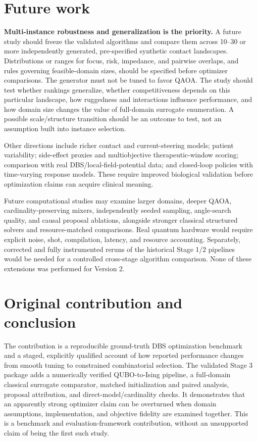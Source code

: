 \documentclass[11pt,letterpaper]{article}
\begin{document}
\section{Future work}
\textbf{Multi-instance robustness and generalization is the priority.} A future study should freeze the validated algorithms and compare them across 10--30 or more independently generated, pre-specified synthetic contact landscapes. Distributions or ranges for focus, risk, impedance, and pairwise overlaps, and rules governing feasible-domain sizes, should be specified before optimizer comparisons. The generator must not be tuned to favor QAOA. The study should test whether rankings generalize, whether competitiveness depends on this particular landscape, how ruggedness and interactions influence performance, and how domain size changes the value of full-domain surrogate enumeration. A possible scale/structure transition should be an outcome to test, not an assumption built into instance selection.

Other directions include richer contact and current-steering models; patient variability; side-effect proxies and multiobjective therapeutic-window scoring; comparison with real DBS/local-field-potential data; and closed-loop policies with time-varying response models. These require improved biological validation before optimization claims can acquire clinical meaning.

Future computational studies may examine larger domains, deeper QAOA, cardinality-preserving mixers, independently seeded sampling, angle-search quality, and causal proposal ablations, alongside stronger classical structured solvers and resource-matched comparisons. Real quantum hardware would require explicit noise, shot, compilation, latency, and resource accounting. Separately, corrected and fully instrumented reruns of the historical Stage 1/2 pipelines would be needed for a controlled cross-stage algorithm comparison. None of these extensions was performed for Version 2.

\section{Original contribution and conclusion}
The contribution is a reproducible ground-truth DBS optimization benchmark and a staged, explicitly qualified account of how reported performance changes from smooth tuning to constrained combinatorial selection. The validated Stage 3 package adds a numerically verified QUBO-to-Ising pipeline, a full-domain classical surrogate comparator, matched initialization and paired analysis, proposal attribution, and direct-model/cardinality checks. It demonstrates that an apparently strong optimizer claim can be overturned when domain assumptions, implementation, and objective fidelity are examined together. This is a benchmark and evaluation-framework contribution, without an unsupported claim of being the first such study.
\end{document}
